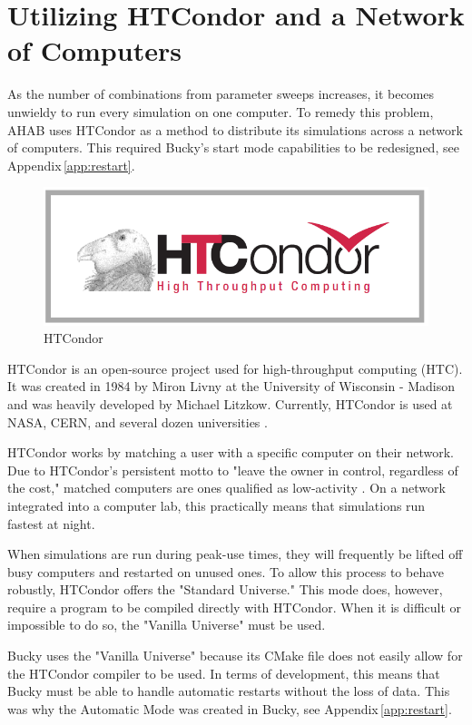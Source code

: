 \section{Utilizing HTCondor and a Network of Computers}

As the number of combinations from parameter sweeps increases, it becomes unwieldy to run every simulation on one computer.  To remedy this problem, AHAB uses HTCondor as a method to distribute its simulations across a network of computers.  This required Bucky's start mode capabilities to be redesigned, see Appendix\,\ref{app:restart}.


\begin{figure}	
	\centering
	\includegraphics[width=.72\textwidth]{graphics/HTCondor.png}
	\caption[HTCondor]{ HTCondor \\  }
	\label{fig:HTCondor}
\end{figure}

HTCondor is an open-source project used for high-throughput computing (HTC).  It was created in 1984 by Miron Livny at the University of Wisconsin - Madison and was heavily developed by Michael Litzkow.  Currently, HTCondor is used at NASA, CERN, and several dozen universities \citep{htc}.   







HTCondor works by matching a user with a specific computer on their network.  Due to HTCondor's persistent motto to "leave the owner in control, regardless of the cost," matched computers are ones qualified as low-activity \citep{htc}.  On a network integrated into a computer lab, this practically means that simulations run fastest at night.

When simulations are run during peak-use times, they will frequently be lifted off busy computers and restarted on unused ones.  To allow this process to behave robustly, HTCondor offers the "Standard Universe."  This mode does, however, require a program to be compiled directly with HTCondor.  When it is difficult or impossible to do so, the "Vanilla Universe" must be used.  

Bucky uses the "Vanilla Universe" because its CMake file does not easily allow for the HTCondor compiler to be used.  In terms of development, this means that Bucky must be able to handle automatic restarts without the loss of data.  This was why the Automatic Mode was created in Bucky, see Appendix\,\ref{app:restart}.

